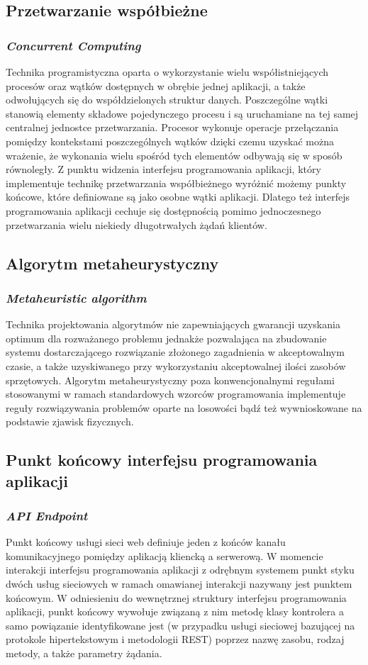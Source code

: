 \subsection*{Przetwarzanie współbieżne}
\subsubsection{\textit{Concurrent Computing}}
Technika programistyczna oparta o wykorzystanie wielu współistniejących procesów oraz wątków dostępnych w obrębie jednej aplikacji, a także odwołujących się do współdzielonych struktur danych. Poszczególne wątki stanowią elementy składowe pojedynczego procesu i są uruchamiane na tej samej centralnej jednostce przetwarzania. Procesor wykonuje operacje przełączania pomiędzy kontekstami poszczególnych wątków dzięki czemu uzyskać można wrażenie, że wykonania wielu spośród tych elementów odbywają się w sposób równoległy. Z punktu widzenia interfejsu programowania aplikacji, który implementuje technikę przetwarzania współbieżnego wyróżnić możemy punkty końcowe, które definiowane są jako osobne wątki aplikacji. Dlatego też interfejs programowania aplikacji cechuje się dostępnością pomimo jednoczesnego przetwarzania wielu niekiedy długotrwałych żądań klientów.

\subsection*{Algorytm metaheurystyczny}
\subsubsection{\textit{Metaheuristic algorithm}}
Technika projektowania algorytmów nie zapewniających gwarancji uzyskania optimum dla rozważanego problemu jednakże pozwalająca na zbudowanie systemu dostarczającego rozwiązanie złożonego zagadnienia w akceptowalnym czasie, a także uzyskiwanego przy wykorzystaniu akceptowalnej ilości zasobów sprzętowych. Algorytm metaheurystyczny poza konwencjonalnymi regułami stosowanymi w ramach standardowych wzorców programowania implementuje reguły rozwiązywania problemów oparte na losowości bądź też wywnioskowane na podstawie zjawisk fizycznych.

\subsection*{Punkt końcowy interfejsu programowania aplikacji}
\subsubsection{\textit{API Endpoint}}
Punkt końcowy usługi sieci web definiuje jeden z końców kanału komunikacyjnego pomiędzy aplikacją kliencką a serwerową. W momencie interakcji interfejsu programowania aplikacji z odrębnym systemem punkt styku dwóch usług sieciowych w ramach omawianej interakcji nazywany jest punktem końcowym. W odniesieniu do wewnętrznej struktury interfejsu programowania aplikacji, punkt końcowy wywołuje związaną z nim metodę klasy kontrolera a samo powiązanie identyfikowane jest (w przypadku usługi sieciowej bazującej na protokole hipertekstowym i metodologii REST) poprzez nazwę zasobu, rodzaj metody, a także parametry żądania.

